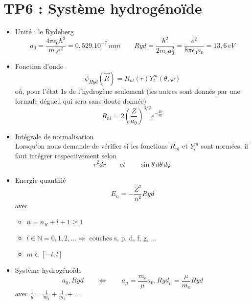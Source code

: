 
\section*{TP6 : Système hydrogénoïde}

\begin{itemize}
	\item Unité : le Rydeberg
	      \begin{equation}
	      	a_0 = \frac{4\pi \epsilon _0 \hbar ^2}{m_e e^2} = 0,529 .10^{-7} \, mm \qquad Ryd = \frac{\hbar ^2}{2m_e a_0^2} = \frac{e^2}{8 \pi \epsilon_0 a_0} = 13,6 \, eV
	      \end{equation}
	      		
	\item Fonction d'onde 
	      \begin{equation}
	      	\psi _{Hyd} (\vec{R}) = R_{nl} (r) Y^m_l (\theta , \varphi )
	      \end{equation}
	      où, pour l'état 1s de l'hydrogène seulement (les autres sont donnés par une formule dégueu qui sera sans doute donnée)
	      \begin{equation}
	      	R_{nl} = 2\left( \frac{Z}{a_0} \right) ^{3/2} e^{-\frac{Zr}{a_0}}
	      \end{equation}
	      		
	\item Intégrale de normalisation \\
	      Lorsqu'on nous demande de vérifier si les fonctions $R_{nl}$ et $Y^m_l$ sont normées, il faut intégrer respectivement selon 
	      \begin{equation}
	      	r^2 dr \qquad et \qquad \sin \theta \, d\theta \, d\varphi
	      \end{equation}
	\item Energie quantifié 
	      \begin{equation}
	      	E_n = -\frac{Z^2}{n^2}Ryd
	      \end{equation}
	      avec 
	      \begin{itemize}
	      	\item $n = n_R +l +1 \geq 1$
	      	\item $l \in \mathbb{N} = 0,1,2, \dots \Rightarrow$ couches s, p, d, f, g, $\dots$		
	      	\item $m \in [-l,l]$
	      \end{itemize} 
	      	
	\item Système hydrogénoïde
	      \begin{equation}
	      	a_0, Ryd \qquad \Leftrightarrow \qquad a_\mu = \frac{m_e}{\mu } a_0, Ryd_\mu = \frac{\mu }{m_e} Ryd
	      \end{equation}
	      avec $\frac{1}{\mu} = \frac{1}{m_1}+\frac{1}{m_2}+ \dots$
\end{itemize}